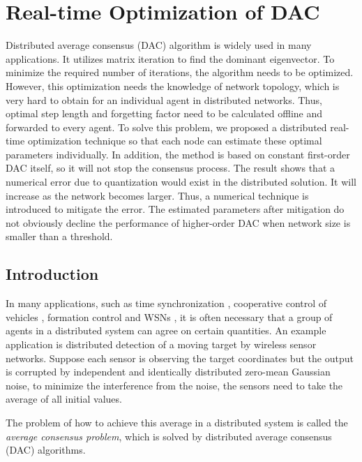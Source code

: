 
\chapter{\label{sec:Online-Optimization-of}Real-time Optimization of DAC }

Distributed average consensus (DAC) algorithm is widely used in many
applications. It utilizes matrix iteration to find the dominant eigenvector.
To minimize the required number of iterations, the algorithm needs
to be optimized. However, this optimization needs the knowledge of
network topology, which is very hard to obtain for an individual agent
in distributed networks.  Thus, optimal step length and forgetting
factor need to be calculated offline and forwarded to every agent.
 To solve this problem, we proposed a distributed real-time optimization
technique so that each node can estimate these optimal parameters
individually. In addition, the method is based on constant first-order
DAC itself, so it will not stop the consensus process. The result
shows that a numerical error due to quantization would exist in the
distributed solution. It will increase as the network becomes larger.
Thus, a numerical  technique is introduced  to mitigate the error.
The estimated parameters after mitigation do not obviously  decline
the performance of higher-order DAC when network size is smaller than
a threshold. 




\section{Introduction}

In many applications, such as time synchronization \cite{Schenato2011},
cooperative control of vehicles \cite{Yang2010}, formation control
\cite{Olfati-Saber2012} and WSNs \cite{Hlinka2012}, it is often
necessary that a group of agents in a distributed system can agree
on certain quantities. An example application is distributed detection
of a moving target by wireless sensor networks. Suppose each sensor
is observing the target coordinates but the output is corrupted by
independent and identically distributed zero-mean Gaussian noise,
to minimize the interference from the noise, the sensors need to take
the average of all initial values. 

The problem of how to achieve this average in a distributed system
is called the \textit{average consensus problem},  which is solved
by distributed average consensus (DAC) algorithms. 

